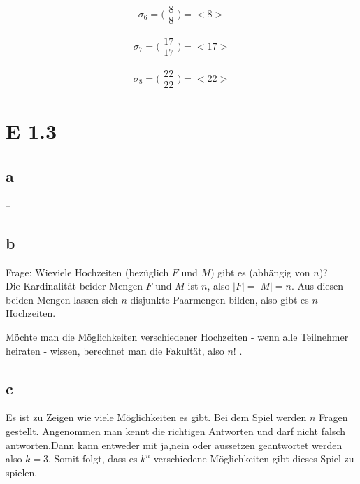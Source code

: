 \documentclass[12pt]{article}
\begin{document}
\begin{equation}
\sigma_6 =
\bigl(\begin{smallmatrix}
8 \\
8
\end{smallmatrix}\bigr) = \bigl < 8 \bigr >
\end{equation}

\begin{equation}
\sigma_7 =
\bigl(\begin{smallmatrix}
17 \\
17
\end{smallmatrix}\bigr) = \big < 17 \big >
\end{equation}

\begin{equation}
\sigma_8 =
\bigl(\begin{smallmatrix}
22 \\
22
\end{smallmatrix}\bigr) = \bigl < 22 \bigr >
\end{equation}

\section{E 1.3}
\subsection{a}
--
\subsection{b}
Frage: Wieviele Hochzeiten (bezüglich $F$ und $M$) gibt es (abhängig von $n$)? \\

Die Kardinalität beider Mengen $F$ und $M$ ist $n$, also $|F| =|M| = n$. Aus diesen beiden Mengen
lassen sich $n$ disjunkte Paarmengen bilden, also gibt es $n$ Hochzeiten.


Möchte man die Möglichkeiten verschiedener Hochzeiten - wenn alle Teilnehmer heiraten -
 wissen, berechnet man die Fakultät, also $n!$ .

\subsection{c}
Es ist zu Zeigen wie viele Möglichkeiten es gibt. Bei dem Spiel werden $n$ Fragen gestellt. Angenommen
man kennt die richtigen Antworten und darf nicht falsch antworten.Dann kann entweder mit ja,nein oder
aussetzen geantwortet werden also $k=3$. Somit folgt, dass es $k^n$ verschiedene Möglichkeiten gibt dieses
Spiel zu spielen. 
\end{document}

